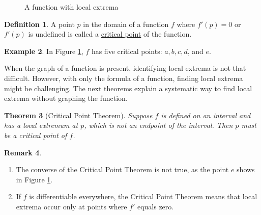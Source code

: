 \documentclass[12pt,letterpaper]{book}
\numberwithin{equation}{section}
\newtheorem{thm}{\textbf{Theorem}}[section]
\theoremstyle{definition}
\newtheorem{defi}[thm]{\textbf{Definition}}
\newtheorem{example}[thm]{\textbf{Example}}
\newtheorem{remark}[thm]{\textbf{Remark}}
\begin{document}
\begin{figure}[!h]
\begin{center}
\caption{A function with local extrema}
\label{extreme1}
\end{center}
\end{figure}

\begin{defi} A point $p$ in the domain of a function $f$ where $f'(p)=0$ or $f'(p)$ is undefined is called a \underline{critical point} of the function.
\end{defi}

\begin{example} In Figure \ref{extreme1}, $f$ has five critical points: $a,b,c,d$, and $e$.
\end{example}

When the graph of a function is present, identifying local extrema is not that difficult. However, with only the formula of a function, finding local extrema might be challenging. The next theorems explain a systematic way to find local extrema without graphing the function.

\begin{thm}[Critical Point Theorem] Suppose $f$ is defined on an interval and has a local extremum at $p$, which is not an endpoint of the interval. Then $p$ must be a critical point of $f$.
\end{thm}

\begin{remark} \quad
\begin{enumerate}
\item The converse of the Critical Point Theorem is not true, as the point $e$ shows in Figure \ref{extreme1}.
\item If $f$ is differentiable everywhere, the Critical Point Theorem means that local extrema occur only at points where $f'$ equals zero.
\end{enumerate}
\end{remark}
\end{document}
